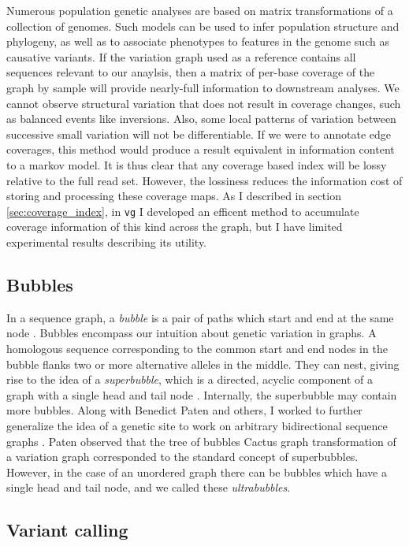Numerous population genetic analyses are based on matrix transformations of a collection of genomes.
Such models can be used to infer population structure and phylogeny, as well as to associate phenotypes to features in the genome such as causative variants.
If the variation graph used as a reference contains all sequences relevant to our anaylsis, then a matrix of per-base coverage of the graph by sample will provide nearly-full information to downstream analyses.
We cannot observe structural variation that does not result in coverage changes, such as balanced events like inversions.
Also, some local patterns of variation between successive small variation will not be differentiable.
If we were to annotate edge coverages, this method would produce a result equivalent in information content to a markov model.
It is thus clear that any coverage based index will be lossy relative to the full read set.
However, the lossiness reduces the information cost of storing and processing these coverage maps.
As I described in section \ref{sec:coverage_index}, in {\tt vg} I developed an efficent method to accumulate coverage information of this kind across the graph, but I have limited experimental results describing its utility.

\subsection{Bubbles}

In a sequence graph, a \emph{bubble} is a pair of paths which start and end at the same node \cite{zerbino2008velvet}.
Bubbles encompass our intuition about genetic variation in graphs.
A homologous sequence corresponding to the common start and end nodes in the bubble flanks two or more alternative alleles in the middle.
They can nest, giving rise to the idea of a \emph{superbubble}, which is a directed, acyclic component of a graph with a single head and tail node \cite{onodera2013detecting,brankovic2016linear}.
Internally, the superbubble may contain more bubbles.
Along with Benedict Paten and others, I worked to further generalize the idea of a genetic site to work on arbitrary bidirectional sequence graphs \cite{paten2018superbubbles}.
Paten observed that the tree of bubbles Cactus graph transformation of a variation graph corresponded to the standard concept of superbubbles.
However, in the case of an unordered graph there can be bubbles which have a single head and tail node, and we called these \emph{ultrabubbles}.

\subsection{Variant calling}

